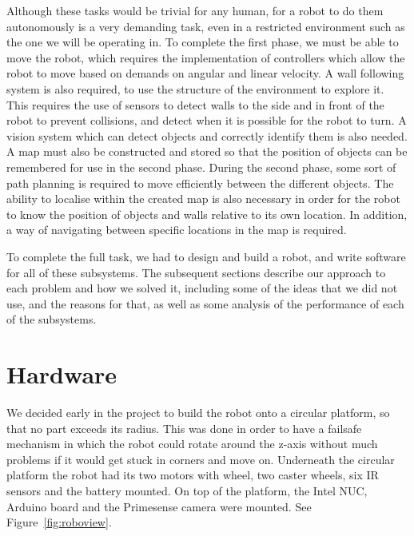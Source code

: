 \documentclass[10pt,a4paper,twocolumn]{article}
\begin{document}
Although these tasks would be trivial for any human, for a robot to do them
autonomously is a very demanding task, even in a restricted environment such as
the one we will be operating in. To complete the first phase, we must be able to
move the robot, which requires the implementation of controllers which allow the
robot to move based on demands on angular and linear velocity. A wall following
system is also required, to use the structure of the environment to explore it.
This requires the use of sensors to detect walls to the side and in front of the
robot to prevent collisions, and detect when it is possible for the robot to
turn. A vision system which can detect objects and correctly identify them is
also needed. A map must also be constructed and stored so that the position of
objects can be remembered for use in the second phase. During the second phase,
some sort of path planning is required to move efficiently between the different
objects. The ability to localise within the created map is also necessary in
order for the robot to know the position of objects and walls relative to its
own location. In addition, a way of navigating between specific locations in the
map is required.

To complete the full task, we had to design and build a robot, and write
software for all of these subsystems. The subsequent sections describe our
approach to each problem and how we solved it, including some of the ideas that
we did not use, and the reasons for that, as well as some analysis of the
performance of each of the subsystems.


\section{Hardware}
We decided early in the project to build the robot onto a circular platform, so
that no part exceeds its radius. This was done in order to have a failsafe
mechanism in which the robot could rotate around the z-axis without much
problems if it would get stuck in corners and move on. Underneath the circular
platform the robot had its two motors with wheel, two caster wheels, six IR
sensors and the battery mounted. On top of the platform, the Intel NUC, Arduino
board and the Primesense camera were mounted. See Figure~\ref{fig:roboview}. 
\end{document}

